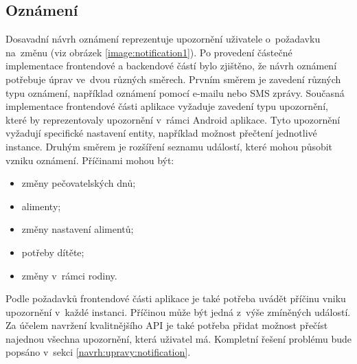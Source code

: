      \subsection{Oznámení}
        Dosavadní návrh oznámení reprezentuje upozornění uživatele o~požadavku na~změnu (viz obrázek \ref{image:notification1}). Po provedení částečné implementace frontendové a backendové částí bylo zjištěno, že návrh oznámení potřebuje úprav ve~dvou různých směrech. Prvním směrem je zavedení různých typu oznámení, například oznámení pomocí e-mailu nebo SMS zprávy. Současná implementace frontendové části aplikace vyžaduje zavedení typu upozornění, které by reprezentovaly upozornění v~rámci Android aplikace. 
        Tyto upozornění vyžadují specifické nastavení entity, například možnost přečtení jednotlivé instance. Druhým směrem je rozšíření seznamu událostí, které mohou působit vzniku oznámení. Příčinami mohou být:
        \begin{itemize}
            \item změny pečovatelských dnů;
            \item alimenty;
            \item změny nastavení alimentů;
            \item potřeby dítěte;
            \item změny v~rámci rodiny.
        \end{itemize}
        Podle požadavků frontendové části aplikace je také potřeba uvádět příčinu vniku upozornění v~každé instanci. Příčinou může být jedná z~výše zmíněných událostí. Za účelem navržení kvalitnějšího API je také potřeba přidat možnost přečíst najednou všechna upozornění, která uživatel má. Kompletní řešení problému bude popsáno v~sekci \ref{navrh:upravy:notification}.
        

